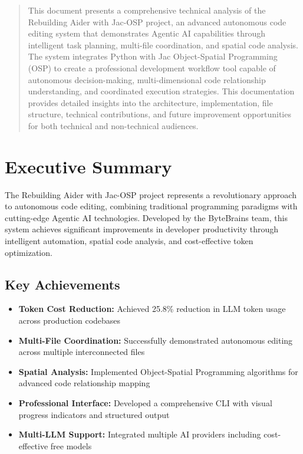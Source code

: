 \documentclass[12pt,a4paper]{article}
\begin{document}
\newpage
\setcounter{page}{1}

\tableofcontents
\newpage

\begin{abstract}
This document presents a comprehensive technical analysis of the Rebuilding Aider with Jac-OSP project, an advanced autonomous code editing system that demonstrates Agentic AI capabilities through intelligent task planning, multi-file coordination, and spatial code analysis. The system integrates Python with Jac Object-Spatial Programming (OSP) to create a professional development workflow tool capable of autonomous decision-making, multi-dimensional code relationship understanding, and coordinated execution strategies. This documentation provides detailed insights into the architecture, implementation, file structure, technical contributions, and future improvement opportunities for both technical and non-technical audiences.
\end{abstract}

\section{Executive Summary}

The Rebuilding Aider with Jac-OSP project represents a revolutionary approach to autonomous code editing, combining traditional programming paradigms with cutting-edge Agentic AI technologies. Developed by the ByteBrains team, this system achieves significant improvements in developer productivity through intelligent automation, spatial code analysis, and cost-effective token optimization.

\subsection{Key Achievements}
\begin{itemize}
    \item \textbf{Token Cost Reduction:} Achieved 25.8\% reduction in LLM token usage across production codebases
    \item \textbf{Multi-File Coordination:} Successfully demonstrated autonomous editing across multiple interconnected files
    \item \textbf{Spatial Analysis:} Implemented Object-Spatial Programming algorithms for advanced code relationship mapping
    \item \textbf{Professional Interface:} Developed a comprehensive CLI with visual progress indicators and structured output
    \item \textbf{Multi-LLM Support:} Integrated multiple AI providers including cost-effective free models
\end{itemize}
\end{document}
